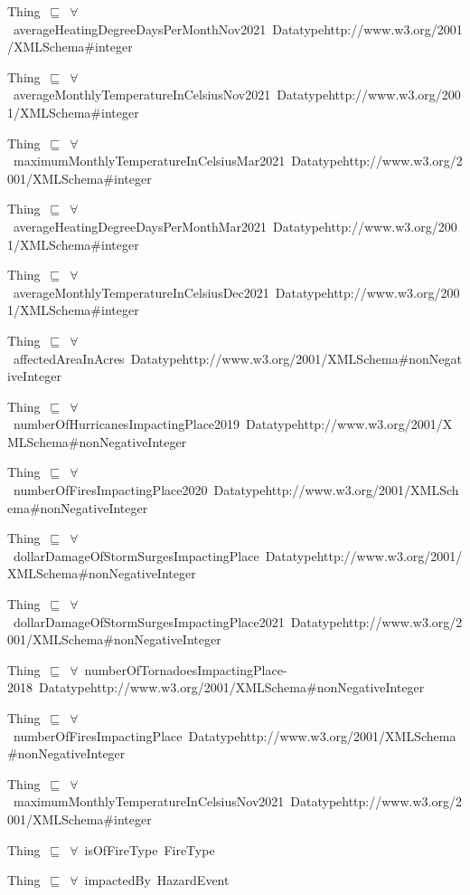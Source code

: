 \documentclass{article}
\begin{document}
Thing~\ensuremath{\sqsubseteq}~\ensuremath{\forall}~averageHeatingDegreeDaysPerMonthNov2021~Datatypehttp://www.w3.org/2001/XMLSchema#integer~

Thing~\ensuremath{\sqsubseteq}~\ensuremath{\forall}~averageMonthlyTemperatureInCelsiusNov2021~Datatypehttp://www.w3.org/2001/XMLSchema#integer~

Thing~\ensuremath{\sqsubseteq}~\ensuremath{\forall}~maximumMonthlyTemperatureInCelsiusMar2021~Datatypehttp://www.w3.org/2001/XMLSchema#integer~

Thing~\ensuremath{\sqsubseteq}~\ensuremath{\forall}~averageHeatingDegreeDaysPerMonthMar2021~Datatypehttp://www.w3.org/2001/XMLSchema#integer~

Thing~\ensuremath{\sqsubseteq}~\ensuremath{\forall}~averageMonthlyTemperatureInCelsiusDec2021~Datatypehttp://www.w3.org/2001/XMLSchema#integer~

Thing~\ensuremath{\sqsubseteq}~\ensuremath{\forall}~affectedAreaInAcres~Datatypehttp://www.w3.org/2001/XMLSchema#nonNegativeInteger~

Thing~\ensuremath{\sqsubseteq}~\ensuremath{\forall}~numberOfHurricanesImpactingPlace2019~Datatypehttp://www.w3.org/2001/XMLSchema#nonNegativeInteger~

Thing~\ensuremath{\sqsubseteq}~\ensuremath{\forall}~numberOfFiresImpactingPlace2020~Datatypehttp://www.w3.org/2001/XMLSchema#nonNegativeInteger~

Thing~\ensuremath{\sqsubseteq}~\ensuremath{\forall}~dollarDamageOfStormSurgesImpactingPlace~Datatypehttp://www.w3.org/2001/XMLSchema#nonNegativeInteger~

Thing~\ensuremath{\sqsubseteq}~\ensuremath{\forall}~dollarDamageOfStormSurgesImpactingPlace2021~Datatypehttp://www.w3.org/2001/XMLSchema#nonNegativeInteger~

Thing~\ensuremath{\sqsubseteq}~\ensuremath{\forall}~numberOfTornadoesImpactingPlace-2018~Datatypehttp://www.w3.org/2001/XMLSchema#nonNegativeInteger~

Thing~\ensuremath{\sqsubseteq}~\ensuremath{\forall}~numberOfFiresImpactingPlace~Datatypehttp://www.w3.org/2001/XMLSchema#nonNegativeInteger~

Thing~\ensuremath{\sqsubseteq}~\ensuremath{\forall}~maximumMonthlyTemperatureInCelsiusNov2021~Datatypehttp://www.w3.org/2001/XMLSchema#integer~

Thing~\ensuremath{\sqsubseteq}~\ensuremath{\forall}~isOfFireType~FireType~

Thing~\ensuremath{\sqsubseteq}~\ensuremath{\forall}~impactedBy~HazardEvent~
\end{document}
